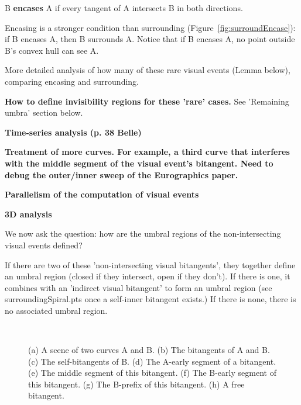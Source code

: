 \documentclass[12pt]{article}
\newif\ifCommentary             %
\begin{document}
\begin{defn2}
\label{defn:encase}
B {\bf encases} A if every tangent of A intersects B in both directions.
\end{defn2}


Encasing is a stronger condition than surrounding (Figure~\ref{fig:surroundEncase}):
if B encases A, then B surrounds A.
Notice that if B encases A, no point outside B's convex hull can see A.


\ifCommentary
Encasing another curve is stronger than surrounding it.
Correspondingly, encasing curves more stringently restrict the region that 
sees the encased curve (Lemma~\ref{lem:countOuter}).
\fi

\begin{theorem}
More detailed analysis of how many of these rare visual events (Lemma below),
comparing encasing and surrounding.
\end{theorem}

{\bf How to define invisibility regions for these 'rare' cases.}
See 'Remaining umbra' section below.

{\bf Time-series analysis (p. 38 Belle)}

{\bf Treatment of more curves.  For example, a third curve that interferes with the middle segment of the visual event's bitangent.  Need to debug the outer/inner sweep of the
Eurographics paper.}

{\bf Parallelism of the computation of visual events}

{\bf 3D analysis}

We now ask the question: 
how are the umbral regions of the non-intersecting visual events defined?


If there are two of these 'non-intersecting visual bitangents', they together define
an umbral region (closed if they intersect, open if they don't).
If there is one, it combines with an 'indirect visual bitangent' to form an umbral region
(see surroundingSpiral.pts once a self-inner bitangent exists.)
If there is none, there is no associated umbral region.

\clearpage

\begin{figure}[h]
\begin{center}
\ 
\end{center}
\caption{(a) A scene of two curves A and B.
         (b) The bitangents of A and B.
         (c) The self-bitangents of B.
         (d) The A-early segment of a bitangent.
         (e) The middle segment of this bitangent.
         (f) The B-early segment of this bitangent.
         (g) The B-prefix of this bitangent.
         (h) A free bitangent.}
\label{fig:bitang}
\end{figure}
\end{document}
